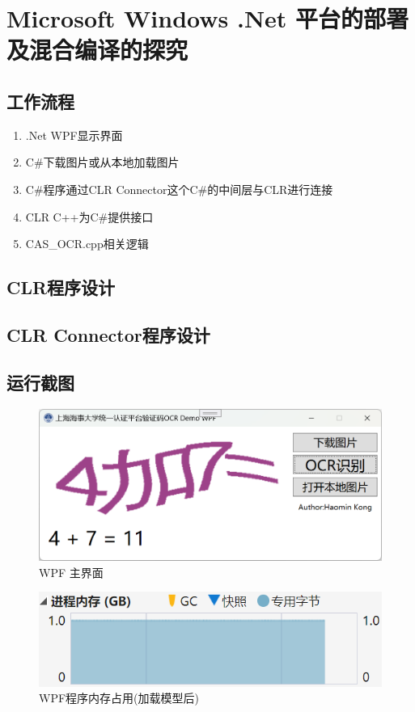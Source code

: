 \chapter{Microsoft Windows .Net 平台的部署及混合编译的探究}
\label{chapter:9dotnet}



\section{工作流程}

\begin{enumerate}
	\item .Net WPF显示界面
	\item C\#下载图片或从本地加载图片
	\item C\#程序通过CLR Connector这个C\#的中间层与CLR进行连接
	\item CLR C++为C\#提供接口
	\item CAS\_OCR.cpp相关逻辑
\end{enumerate}

\section{CLR程序设计}



\section{CLR Connector程序设计}

\section{运行截图}

\begin{figure}
	\centering
	\includegraphics[width=0.7\linewidth]{Resources/Picture/wpf_main}
	\caption{WPF 主界面}
	\label{fig:wpfmain}
\end{figure}

\begin{figure}
	\centering
	\includegraphics[width=0.7\linewidth]{Resources/Picture/wpf_memory}
	\caption{WPF程序内存占用(加载模型后)}
	\label{fig:wpfmemory}
\end{figure}
